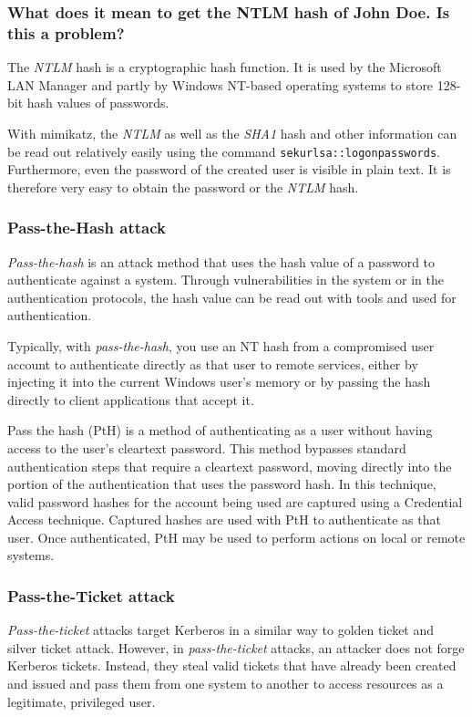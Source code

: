 \subsubsection{What does it mean to get the NTLM hash of John Doe. Is this a problem?}
The \textit{NTLM} hash is a cryptographic hash function. It is used by the Microsoft LAN Manager and partly by Windows NT-based operating systems to store 128-bit hash values of passwords.

With mimikatz, the \textit{NTLM} as well as the \textit{SHA1} hash and other information can be read out relatively easily using the command \lstinline|sekurlsa::logonpasswords|. Furthermore, even the password of the created user is visible in plain text. It is therefore very easy to obtain the password or the \textit{NTLM} hash.

\subsubsection{Pass-the-Hash attack}
\textit{Pass-the-hash} is an attack method that uses the hash value of a password to authenticate against a system. Through vulnerabilities in the system or in the authentication protocols, the hash value can be read out with tools and used for authentication.

Typically, with \textit{pass-the-hash}, you use an NT hash from a compromised user account to authenticate directly as that user to remote services, either by injecting it into the current Windows user's memory or by passing the hash directly to client applications that accept it.

Pass the hash (PtH) is a method of authenticating as a user without having access to the user's cleartext password. This method bypasses standard authentication steps that require a cleartext password, moving directly into the portion of the authentication that uses the password hash. In this technique, valid password hashes for the account being used are captured using a Credential Access technique. Captured hashes are used with PtH to authenticate as that user. Once authenticated, PtH may be used to perform actions on local or remote systems.

\subsubsection{Pass-the-Ticket attack}
\textit{Pass-the-ticket} attacks target Kerberos in a similar way to golden ticket and silver ticket attack. However, in \textit{pass-the-ticket} attacks, an attacker does not forge Kerberos tickets. Instead, they steal valid tickets that have already been created and issued and pass them from one system to another to access resources as a legitimate, privileged user.

